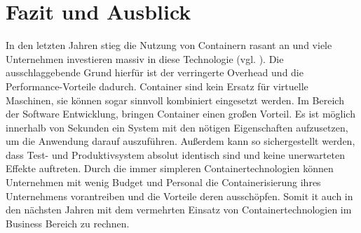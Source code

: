 \section{Fazit und Ausblick} 
\label{sec:Fazit}
In den letzten Jahren stieg die Nutzung von Containern rasant an und viele Unternehmen investieren massiv in diese Technologie (vgl. ). Die ausschlaggebende Grund hierfür ist der verringerte Overhead und die Performance-Vorteile dadurch. Container sind kein Ersatz für virtuelle Maschinen, sie können sogar sinnvoll kombiniert eingesetzt werden. Im Bereich der Software Entwicklung, bringen Container einen großen Vorteil. Es ist möglich innerhalb von Sekunden ein System mit den nötigen Eigenschaften aufzusetzen, um die Anwendung darauf auszuführen. Außerdem kann so sichergestellt werden, dass Test- und Produktivsystem absolut identisch sind und keine unerwarteten Effekte auftreten. Durch die immer simpleren Containertechnologien können Unternehmen mit wenig Budget und Personal die Containerisierung ihres Unternehmens vorantreiben und die Vorteile deren ausschöpfen. Somit it auch in den nächsten Jahren mit dem vermehrten Einsatz von Containertechnologien im Business Bereich zu rechnen. 

